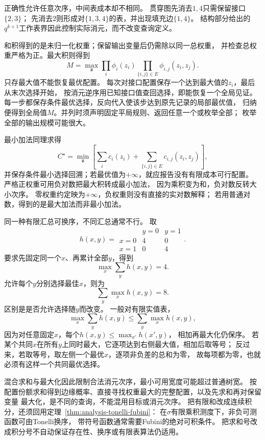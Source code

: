 正确性允许任意次序，中间表成本却不相同。
贯穿图先消去\(1,4\)只需保留接口\(\{2,3\}\)；
先消去\(2\)则形成对\(\{1,3,4\}\)的表，并出现填充边\(\{1,4\}\)。
结构部分给出的\(q^{k+1}\)工作表界因此控制实际消元，而不改变查询定义。

和积得到的是未归一化权重；保留输出变量后仍需除以同一总权重，
并检查总权重严格为正。最大积则得到
\[
  M=\max_{\bm z}\prod_i\phi_i(z_i)
        \prod_{\{i,j\}\in E}\phi_{i,j}(z_i,z_j).
\]
只存最大值不能恢复最优配置。
每次对接口配置保存一个达到最大值的\(z_i\)，最后从末次选择开始，
按消元逆序用已知接口值查回选择，即能恢复一个全局见证。
每一步都保存条件最优选择，反向代入使该步达到原先记录的局部最优值，
归纳便得到全局值\(M\)。并列时须声明固定平局规则、返回任意一个或枚举全部；
枚举全部的输出规模可能很大。

最小加法同理求得
\[
  C^\star=\min_{\bm z}
    \left[\sum_i c_i(z_i)+\sum_{\{i,j\}\in E}c_{i,j}(z_i,z_j)\right],
\]
并保存条件最小选择回溯；若最优值为\(+\infty\)，就应报告没有有限成本可行配置。
严格正权重可用负对数把最大积转成最小加法，
因为乘积变为和，负对数反转大小次序。
零权重约定映为\(+\infty\)，负权重则没有直接的实对数解释；
若用普通对数，得到的是最大加法而非最小加法。

同一种有限汇总可换序，不同汇总通常不行。
取
\[
  h(x,y)=
  \begin{array}{c|cc}
    &y=0&y=1\\ \hline
    x=0&4&0\\
    x=1&0&4
  \end{array}.
\]
要求先固定同一个\(x\)、再累计全部\(y\)，得到
\begin{equation}
  \max_x\sum_yh(x,y)=4.
  \label{eq:graph-theory-max-sum-order-a}
\end{equation}
允许每个\(y\)分别选择最佳\(x\)，则为
\begin{equation}
  \sum_y\max_xh(x,y)=8.
  \label{eq:graph-theory-max-sum-order-b}
\end{equation}
区别是是否允许选择随\(y\)而改变。
一般对有限实值表，
\[
  \max_x\sum_yh(x,y)\leq\sum_y\max_xh(x,y),
\]
因为对任意固定\(x\)，每个\(h(x,y)\leq\max_{x'}h(x',y)\)，
相加再最大化仍保序。
若某个共同\(x\)在所有\(y\)上同时最大，它逐项达到右侧最大值，相加后取等号；
反过来，若取等号，取左侧一个最优\(x\)，逐项非负差的总和为零，
故每项都为零，也就必须有这样一个共同最优选择。

混合求和与最大化因此限制合法消元次序，最小可用宽度可能超过普通树宽。
按配置份额求和得到边缘概率、直接寻找权重最大的完整配置，以及先求和再对保留变量
最大化，是不同的查询，不能混用目标或消元次序。
把有限和改成连续积分，还须回用定理~\ref{thm:analysis-tonelli-fubini}：
在\(\sigma\)有限乘积测度下，非负可测函数可由Tonelli换序，
带符号函数通常需要Fubini的绝对可积条件。
把求和号改成积分号不自动保证存在性、换序或有限表算法仍适用。

